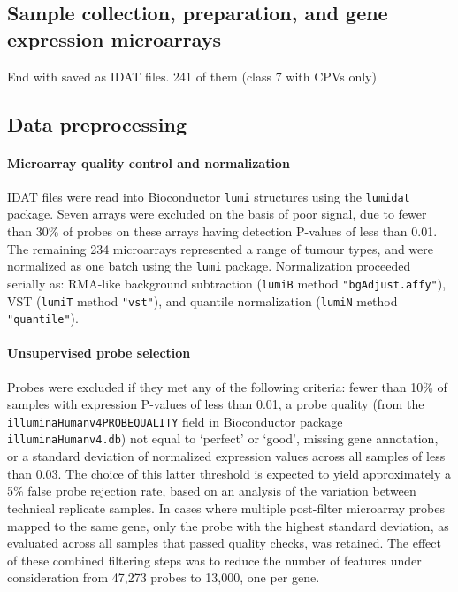 \documentclass[thesis.tex]{subfiles}
\begin{document}
\subsection{Sample collection, preparation, and gene expression microarrays}
\mpfatal{}
End with saved as \gls{IDAT} files.  241 of them (class 7 with CPVs only)

\subsection{Data preprocessing}
\paragraph{Microarray quality control and normalization}
\gls{IDAT} files were read into Bioconductor \texttt{lumi} structures using the \texttt{lumidat} package.  Seven arrays were excluded on the basis of poor signal, due to fewer than 30\% of probes on these arrays having detection P-values of less than 0.01.  The remaining 234 microarrays represented a range of tumour types, and were normalized as one batch using the \texttt{lumi} package.  Normalization proceeded serially as: RMA-like background subtraction (\texttt{lumiB} method \texttt{"bgAdjust.affy"}), VST (\texttt{lumiT} method \texttt{"vst"}), and quantile normalization (\texttt{lumiN} method \texttt{"quantile"}).

\paragraph{Unsupervised probe selection}
Probes were excluded if they met any of the following criteria: fewer than 10\% of samples with expression P-values of less than 0.01, a probe quality (from the \texttt{illuminaHumanv4PROBEQUALITY} field in Bioconductor package \texttt{illuminaHumanv4.db}) not equal to `perfect' or `good', missing gene annotation, or a standard deviation of normalized expression values across all samples of less than 0.03.  The choice of this latter threshold is expected to yield approximately a 5\% false probe rejection rate, based on an analysis of the variation between technical replicate samples.  In cases where multiple post-filter microarray probes mapped to the same gene, only the probe with the highest standard deviation, as evaluated across all samples that passed quality checks, was retained.  The effect of these combined filtering steps was to reduce the number of features under consideration from 47,273 probes to 13,000, one per gene.
\end{document}

